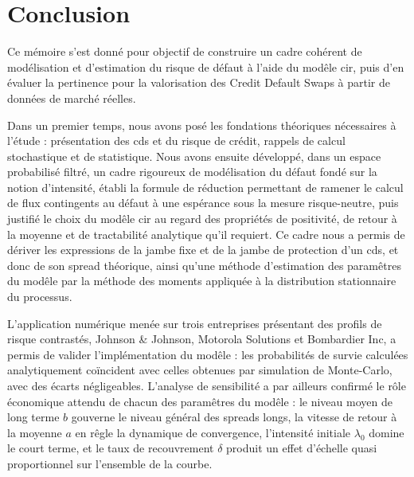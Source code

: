 \chapter*{Conclusion}

Ce mémoire s'est donné pour objectif de construire un cadre cohérent de
modélisation et d'estimation du risque de défaut à l'aide du modêle
\gls{cir}, puis d'en évaluer la pertinence pour la valorisation
des Credit Default Swaps à partir de données de marché réelles.

Dans un premier temps, nous avons posé les fondations théoriques
nécessaires à l'étude : présentation des \gls{cds} et du risque de crédit,
rappels de calcul stochastique et de statistique. Nous avons ensuite
développé, dans un espace probabilisé filtré, un cadre rigoureux de
modélisation du défaut fondé sur la notion d'intensité, établi la
formule de réduction permettant de ramener le calcul de flux contingents au
défaut à une espérance sous la mesure risque-neutre, puis justifié le
choix du modêle \gls{cir} au regard des propriétés de positivité, de retour à
la moyenne et de tractabilité analytique qu'il requiert. Ce cadre nous a
permis de dériver les expressions de la jambe fixe et de la jambe de
protection d'un \gls{cds}, et donc de son spread théorique, ainsi qu'une méthode
d'estimation des paramêtres du modêle par la méthode des moments appliquée
à la distribution stationnaire du processus.

L'application numérique menée sur trois entreprises présentant des profils
de risque contrastés, Johnson \& Johnson, Motorola Solutions et Bombardier
Inc, a permis de valider l'implémentation du modêle : les probabilités de
survie calculées analytiquement coïncident avec celles obtenues par
simulation de Monte-Carlo, avec des écarts négligeables. L'analyse de
sensibilité a par ailleurs confirmé le rôle économique attendu de chacun
des paramêtres du modêle : le niveau moyen de long terme $b$ gouverne le
niveau général des spreads longs, la vitesse de retour à la moyenne $a$
en rêgle la dynamique de convergence, l'intensité initiale $\lambda_0$
domine le court terme, et le taux de recouvrement $\delta$ produit un effet
d'échelle quasi proportionnel sur l'ensemble de la courbe.

